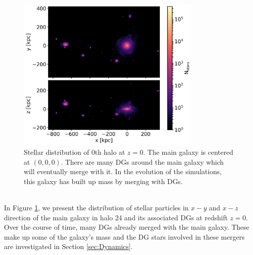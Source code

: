 \begin{figure}[htbp]
\captionsetup{format=plain}
    \centering
    	\includegraphics[width=0.8\textwidth]{plots/Auriga/Au24_stars_xz_distribution_halo0.png}
    \caption{Stellar distribution of 0th halo at $\textit{z}=0$. The main galaxy is centered at $(0,0,0)$. There are many \acp{DG} around the main galaxy which will eventually merge with it. In the evolution of the simulations, this galaxy has built up mass by merging with \acp{DG}. }\label{fig:Stars_AU24}
\end{figure}
\\In Figure \ref{fig:Stars_AU24}, we present the distribution of stellar particles in $x-y$ and $x-z$ direction of the main galaxy in halo 24 and its associated \acp{DG} at redshift $z=0$. Over the course of time, many \acp{DG} already merged with the main galaxy. These make up some of the galaxy's mass and the \ac{DG} stars involved in these mergers are investigated in Section \ref{sec:Dynamics}.\\
